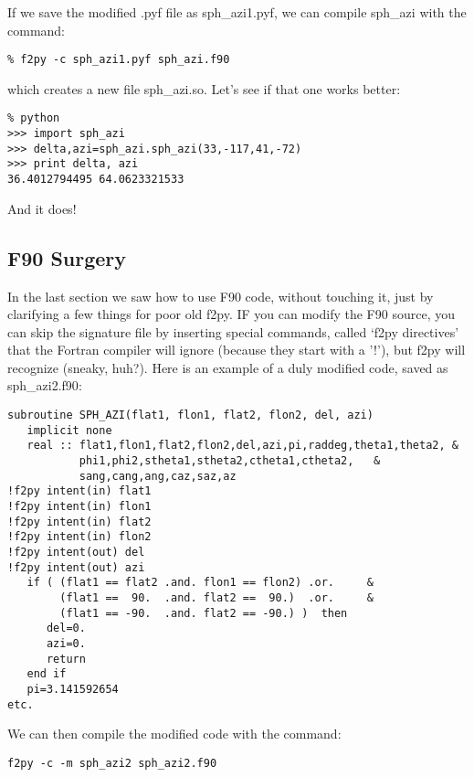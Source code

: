 {\noindent If we save the modified .pyf file as {\color{blue}sph\_azi1.pyf}, we can compile {\color{blue}sph\_azi}   with the command:

{\singlespacing \color{blue} \begin{verbatim}
% f2py -c sph_azi1.pyf sph_azi.f90
\end{verbatim}}

\noindent which creates a new file {\color{blue}sph\_azi.so}.  Let's see if that one works better: 

{\singlespacing \color{blue} \begin{verbatim}
% python
>>> import sph_azi
>>> delta,azi=sph_azi.sph_azi(33,-117,41,-72)
>>> print delta, azi
36.4012794495 64.0623321533
\end{verbatim}}

\noindent And it does!   

\subsection{F90 Surgery}

In the last section we saw how to use F90 code, without touching it, just by clarifying a few things for poor old {\color{blue}f2py}.  
 IF you can modify the F90 source, you can skip the signature file by inserting special commands, called `f2py directives'   that the Fortran compiler will ignore (because they start with a '!'), but f2py will recognize (sneaky, huh?).  Here is an example of a duly  modified code, saved as {\color{blue}sph\_azi2.f90}:


{\singlespacing \color{blue} \begin{verbatim}
subroutine SPH_AZI(flat1, flon1, flat2, flon2, del, azi)
   implicit none
   real :: flat1,flon1,flat2,flon2,del,azi,pi,raddeg,theta1,theta2, &
           phi1,phi2,stheta1,stheta2,ctheta1,ctheta2,   &
           sang,cang,ang,caz,saz,az
!f2py intent(in) flat1
!f2py intent(in) flon1
!f2py intent(in) flat2
!f2py intent(in) flon2
!f2py intent(out) del
!f2py intent(out) azi
   if ( (flat1 == flat2 .and. flon1 == flon2) .or.     &
        (flat1 ==  90.  .and. flat2 ==  90.)  .or.     &
        (flat1 == -90.  .and. flat2 == -90.) )  then
      del=0.
      azi=0.
      return
   end if
   pi=3.141592654
etc.
\end{verbatim}}

\noindent  We can then compile the modified code with the command:

{\singlespacing \color{blue} \begin{verbatim}
f2py -c -m sph_azi2 sph_azi2.f90
\end{verbatim}}

}
